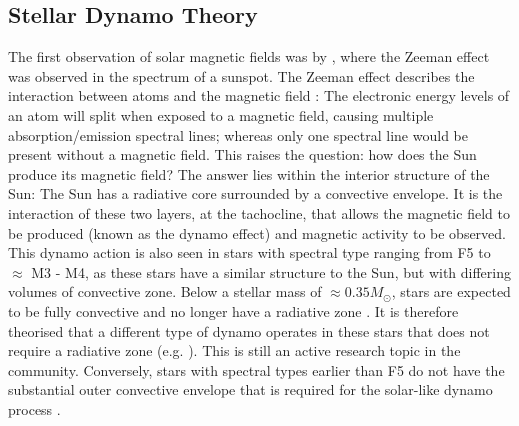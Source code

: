 \subsection{Stellar Dynamo Theory}
The first observation of solar magnetic fields was by \citet{Hale_1908}, where the Zeeman effect was observed in the spectrum of a sunspot. The Zeeman effect describes the interaction between atoms and the magnetic field \citep{Zeeman_1897}: The electronic energy levels of an atom will split when exposed to a magnetic field, causing multiple absorption/emission spectral lines; whereas only one spectral line would be present without a magnetic field. This raises the question: how does the Sun produce its magnetic field? The answer lies within the interior structure of the Sun: The Sun has a radiative core surrounded by a convective envelope. It is the interaction of these two layers, at the tachocline, that allows the magnetic field to be produced (known as the dynamo effect) and magnetic activity to be observed. This dynamo action is also seen in stars with spectral type ranging from F5 to $\approx$ M3 - M4, as these stars have a similar structure to the Sun, but with differing volumes of convective zone. Below a stellar mass of $\approx 0.35 M_{\odot}$, stars are expected to be fully convective and no longer have a radiative zone \citep{Chabrier_1997}. It is therefore theorised that a different type of dynamo operates in these stars that does not require a radiative zone (e.g. \citealt{Durney_etal_1993}). This is still an active research topic in the community. Conversely, stars with spectral types earlier than F5 do not have the substantial outer convective envelope that is required for the solar-like dynamo process \citep{Pinsonneault_etal_2001}.

